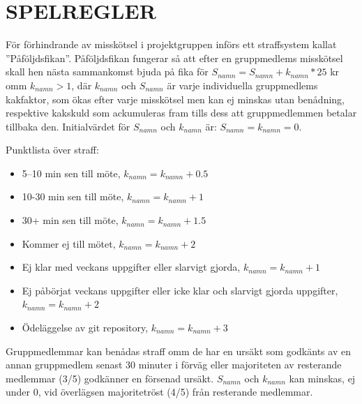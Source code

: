 \documentclass[a4paper]{article}
\begin{document}
\section{SPELREGLER}
\label{sec:spelregler}

För förhindrande av misskötsel i projektgruppen införs ett straffsystem kallat ”Påföljdsfikan”. Påföljdsfikan fungerar så att efter en gruppmedlems misskötsel skall hen nästa sammankomst bjuda på fika för $S_{namn} = S_{namn} + k_{namn}*25$ kr omm $k_{namn}>1$, där $k_{namn}$ och $S_{namn}$ är varje individuella gruppmedlems kakfaktor, som ökas efter varje misskötsel men kan ej minskas utan benådning, respektive kakskuld som ackumuleras fram tills dess att gruppmedlemmen betalar tillbaka den. Initialvärdet för $S_{namn}$ och $k_{namn}$ är: $S_{namn}=k_{namn}=0.$\\ \par
Punktlista över straff:
\begin{itemize}
	\item 5–10 min sen till möte, $k_{namn} = k_{namn} + 0.5$
	\item 10-30 min sen till möte, $k_{namn} = k_{namn} + 1$
	\item 30+ min sen till möte, $k_{namn} = k_{namn} + 1.5$
	\item Kommer ej till mötet, $k_{namn} = k_{namn} + 2$
	\item Ej klar med veckans uppgifter eller slarvigt gjorda, $k_{namn} = k_{namn} + 1$
	\item Ej påbörjat veckans uppgifter eller icke klar och slarvigt gjorda uppgifter, \indent $k_{namn} = k_{namn} + 2$
	\item Ödeläggelse av git repository, $k_{namn} = k_{namn} + 3$
\end{itemize}
\par
Gruppmedlemmar kan benådas straff omm de har en ursäkt som godkänts av en annan gruppmedlem senast 30 minuter i förväg eller majoriteten av resterande medlemmar (3/5) godkänner en försenad ursäkt. $S_{namn}$ och $k_{namn}$ kan minskas, ej under 0, vid överlägsen majoritetröst (4/5) från resterande medlemmar.



%
%
\end{document}
